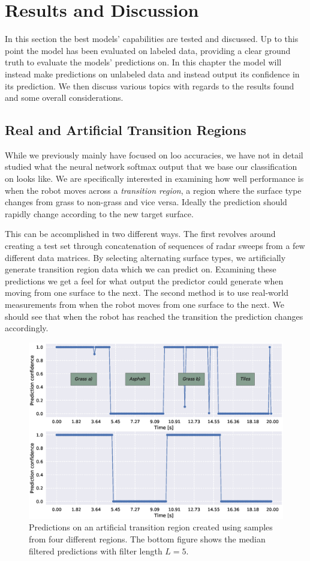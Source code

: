 \chapter{Results and Discussion}
In this section the best models' capabilities are tested and discussed. Up to this point the model has been evaluated on labeled data, providing a clear ground truth to evaluate the models' predictions on. In this chapter the model will instead make predictions on unlabeled data and instead output its confidence in its prediction. We then discuss various topics with regards to the results found and some overall considerations.

\section{Real and Artificial Transition Regions}

While we previously mainly have focused on \gls{loo} accuracies, we have not in detail studied what the neural network softmax output that we base our classification on looks like. We are specifically interested in examining how well performance is when the robot moves across a \emph{transition region}, a region where the surface type changes from grass to non-grass and vice versa. Ideally the prediction should rapidly change according to the new target surface. 

This can be accomplished in two different ways. The first revolves around creating a test set through concatenation of sequences of radar sweeps from a few different data matrices. By selecting alternating surface types, we artificially generate transition region data which we can predict on. Examining these predictions we get a feel for what output the predictor could generate when moving from one surface to the next. The second method is to use real-world measurements from when the robot moves from one surface to the next. We should see that when the robot has reached the transition the prediction changes accordingly. 

\begin{figure}[t]
	\centering
	\includegraphics[scale=0.5]{figs_temp/varmats1}
	\caption{Predictions on an artificial transition region created using samples from four different regions. The bottom figure shows the median filtered predictions with filter length $L=5$.}
	\label{fig:artificial1}
\end{figure}

